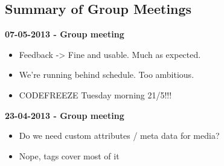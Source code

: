 \documentclass[11pt]{article}
\begin{document}
\begin{landscape}
\begin{multicols}{2}
\section{Summary of Group Meetings}

\textbf{07-05-2013 - Group meeting} 
\begin{itemize}
\item Feedback -> Fine and usable. Much as expected.
\item We're running behind schedule. Too ambitious.
\item CODEFREEZE Tuesday morning 21/5!!!
\end{itemize}

\textbf{23-04-2013 - Group meeting}
\begin{itemize}
\item Do we need custom attributes / meta data for media?
\item Nope, tags cover most of it
\end{itemize}


\end{multicols}
\end{landscape}
\end{document}

